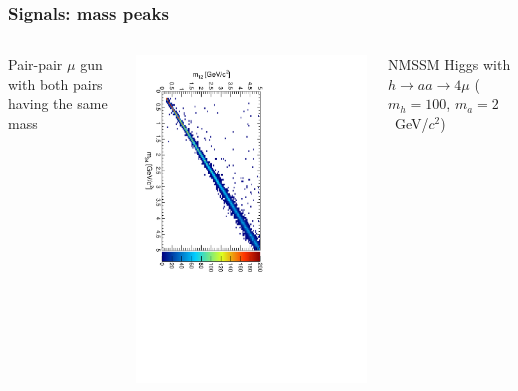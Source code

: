 \documentclass[compress]{beamer}
\begin{document}
\begin{frame}
\frametitle{Signals: mass peaks}

\begin{columns}
Pair-pair $\mu$ gun with both pairs having the same mass

\includegraphics[height=\linewidth, angle=90]{m12m34.pdf}

NMSSM Higgs with $h \to aa \to 4\mu$ ($m_h = 100$, $m_a = 2$~GeV/$c^2$)


\end{columns}
\end{frame}
\end{document}
